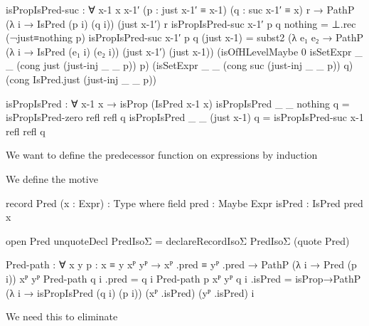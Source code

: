 \begin{code}[hide]
  isPropIsPred-suc :
    ∀ {x-1 x} x-1′ (p : just x-1′ ≡ x-1) (q : suc x-1′ ≡ x) r →
    PathP (λ i → IsPred (p i) (q i)) (just x-1′) r
  isPropIsPred-suc x-1′ p q nothing = ⊥.rec (¬just≡nothing p)
  isPropIsPred-suc x-1′ p q (just x-1) =
    subst2 (λ e₁ e₂ → PathP (λ i → IsPred (e₁ i) (e₂ i)) (just x-1′) (just x-1))
      (isOfHLevelMaybe 0 isSetExpr _ _ (cong just (just-inj _ _ p)) p)
      (isSetExpr _ _ (cong suc (just-inj _ _ p)) q)
      (cong IsPred.just (just-inj _ _ p))

  isPropIsPred : ∀ x-1 x → isProp (IsPred x-1 x)
  isPropIsPred _ _ nothing q = isPropIsPred-zero refl refl q
  isPropIsPred _ _ (just x-1) q = isPropIsPred-suc x-1 refl refl q
\end{code}
We want to define the predecessor function on expressions by induction

We define the motive
\begin{code}
  record Pred (x : Expr) : Type where
    field
      pred : Maybe Expr
      isPred : IsPred pred x
\end{code}
\begin{code}[hide]
  open Pred
  unquoteDecl PredIsoΣ = declareRecordIsoΣ PredIsoΣ (quote Pred)

  Pred-path :
    ∀ {x y} {p : x ≡ y} {xᴾ yᴾ} →
    xᴾ .pred ≡ yᴾ .pred → PathP (λ i → Pred (p i)) xᴾ yᴾ
  Pred-path q i .pred = q i
  Pred-path {p} {xᴾ} {yᴾ} q i .isPred =
    isProp→PathP (λ i → isPropIsPred (q i) (p i)) (xᴾ .isPred) (yᴾ .isPred) i
\end{code}
We need this to eliminate

